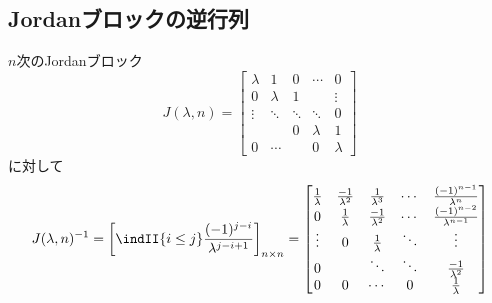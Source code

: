         \subsection{Jordanブロックの逆行列}
            \newcommand{\JBn}{%
                \begin{bmatrix}%
                    \lambda & 1			& 0			& \cdots	& 0\\%
                    0		& \lambda	& 1			& 			&\vdots\\%
                    \vdots	& \ddots	& \ddots	& \ddots	& 0\\%
                            &			& 0			& \lambda	& 1\\%
                    0		& \cdots	&			& 0			& \lambda%
                \end{bmatrix}%
            }
            \begin{shadebox}
                $n$次のJordanブロック
                \[J(\lambda, n) = \JBn\]
                に対して
                \[
                    J(\lambda,n)^{-1} = \left[\indII{i\leq j}\frac{(-1)^{j-i}}{\lambda^{j-i+1}}\right]_{n\times n} =
                    \begin{bmatrix}
                        \frac{1}{\lambda} & \frac{-1}{\lambda^2} & \frac{1}{\lambda^3} & \cdots & \frac{(-1)^{n-1}}{\lambda^n} \\
                        0 & \frac{1}{\lambda} & \frac{-1}{\lambda^2} & \cdots & \frac{(-1)^{n-2}}{\lambda^{n-1}} \\
                        \vdots & 0 & \frac{1}{\lambda} & \ddots & \vdots \\
                        0 & & \ddots & \ddots & \frac{-1}{\lambda^2} \\
                        0 & 0 & \cdots & 0 & \frac{1}{\lambda}
                    \end{bmatrix}
                \]
                \end{shadebox}
